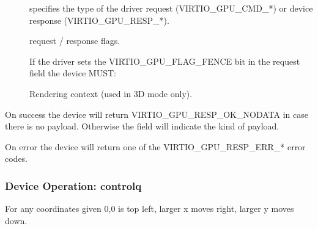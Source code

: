 \begin{description}
\item[] specifies the type of the driver request
  (VIRTIO_GPU_CMD_*) or device response (VIRTIO_GPU_RESP_*).
\item[] request / response flags.
\item[] If the driver sets the VIRTIO_GPU_FLAG_FENCE
  bit in the request  field the device MUST:
\item[] Rendering context (used in 3D mode only).
\end{description}

On success the device will return VIRTIO_GPU_RESP_OK_NODATA in
case there is no payload.  Otherwise the  field will
indicate the kind of payload.

On error the device will return one of the
VIRTIO_GPU_RESP_ERR_* error codes.

\subsubsection{Device Operation: controlq}\label{sec:Device Types / GPU Device / Device Operation / Device Operation: controlq}

For any coordinates given 0,0 is top left, larger x moves right,
larger y moves down.

